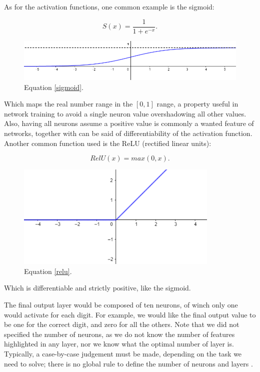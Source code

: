 \documentclass[a4paper]{report}
\begin{document}
As for the activation functions, one common example is the sigmoid:

\begin{equation}
	S(x) = \frac{1}{1+e^{-x}}.
	\label{sigmoid}
\end{equation}

\begin{figure}[H]
\centering
\includegraphics[width=\textwidth]{o/sigmoid.png}
\caption{Equation \ref{sigmoid}.}
\end{figure}
Which maps the real number range in the $[0,1]$ range, a property useful in network training to avoid a single neuron value overshadowing all other values.
Also, having all neurons assume a positive value is commonly a wanted feature of networks, together with can be said of differentiability of the activation function.
Another common function used is the ReLU (rectified linear units):

\begin{equation}
	RelU(x) = max(0, x).
	\label{relu}
\end{equation}

\begin{figure}[H]
\centering
\includegraphics[height=5cm]{o/relu.png}
\caption{Equation \ref{relu}.}
\end{figure}

Which is differentiable and strictly positive, like the sigmoid.

The final output layer would be composed of ten neurons, of winch only one would activate for each digit.
For example, we would like the final output value to be one for the correct digit, and zero for all the others.
Note that we did not specified the number of neurons, as we do not know the number of features highlighted in any layer, nor we know what the optimal number of layer is.
Typically, a case-by-case judgement must be made, depending on the task we need to solve;
there is no global rule to define the number of neurons and layers \cite{bishop2006pattern}.
\end{document}
